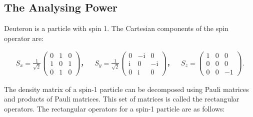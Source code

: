 \documentclass[twocolumn,twoside,showpacs,preprintnumbers,superscriptaddress,amsmath,amssymb,prc]{revtex4}
\begin{document}
\subsection{The Analysing Power}

Deuteron is a particle with spin 1. The Cartesian components of the spin operator are:

\begin{align}
  S_x=\frac{1}{\sqrt{2}}\left(\begin{array}{ccc}
0 & 1 & 0 \\
1 & 0 & 1 \\
0 & 1 & 0
\end{array}\right) ，\quad 
S_y=\frac{1}{\sqrt{2}}\left(\begin{array}{ccc}
0 & -\mathrm{i} & 0 \\
\mathrm{i} & 0 & -\mathrm{i} \\
0 & \mathrm{i} & 0
\end{array}\right) ，\quad
 S_z=\left(\begin{array}{ccc}
1 & 0 & 0 \\
0 & 0 & 0 \\
0 & 0 & -1
\end{array}\right).
\end{align}

The density matrix of a spin-1 particle can be decomposed using Pauli matrices and products of Pauli matrices. This set of matrices is called the rectangular operators.
The rectangular  operators for a spin-1 particle are as follows:
\end{document}
